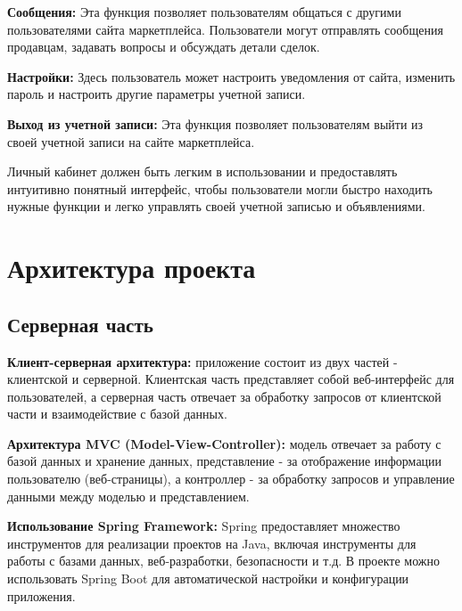 
    \textbf{Сообщения:} Эта функция позволяет пользователям общаться с другими пользователями сайта маркетплейса. Пользователи могут отправлять сообщения продавцам, задавать вопросы и обсуждать детали сделок.

    \textbf{Настройки:} Здесь пользователь может настроить уведомления от сайта, изменить пароль и настроить другие параметры учетной записи.

    \textbf{Выход из учетной записи:} Эта функция позволяет пользователям выйти из своей учетной записи на сайте маркетплейса.

    Личный кабинет должен быть легким в использовании и предоставлять интуитивно понятный интерфейс, чтобы пользователи могли быстро находить нужные функции и легко управлять своей учетной записью и объявлениями.














\section{Архитектура проекта}

\subsection{Серверная часть}
    \textbf{Клиент-серверная архитектура:} приложение состоит из двух частей - клиентской и серверной. Клиентская часть представляет собой веб-интерфейс для пользователей, а серверная часть отвечает за обработку запросов от клиентской части и взаимодействие с базой данных.

    \textbf{Архитектура MVC (Model-View-Controller):} модель отвечает за работу с базой данных и хранение данных, представление - за отображение информации пользователю (веб-страницы), а контроллер - за обработку запросов и управление данными между моделью и представлением.

    \textbf{Использование Spring Framework:} Spring предоставляет множество инструментов для реализации проектов на Java, включая инструменты для работы с базами данных, веб-разработки, безопасности и т.д. В проекте можно использовать Spring Boot для автоматической настройки и конфигурации приложения.

